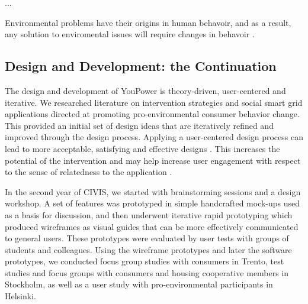 ... 

Environmental problems have their origins in human behavoir, and as a result, any solution to enviromental issues will require changes in behavoir 
\citep{Schultz2014}.

%
%
%

\subsection{Design and Development: the Continuation}

The design and development of YouPower is theory-driven, user-centered and iterative. We researched literature on intervention strategies and social smart grid applications directed at promoting pro-environmental consumer behavior change. This provided an initial set of design ideas that are iteratively refined and improved through the design process. Applying a user-centered design process can lead to more acceptable, satisfying and effective designs \citep{Brynjarsdottir2012}. This increases the potential of the intervention \citep{dick2012empowering} and may help increase user engagement with respect to the sense of relatedness to the application \citep{pierce2003state,schwartz2014people,edward2015review}. 

In the second year of CIVIS, we started with brainstorming sessions and a design workshop. A set of features was prototyped in simple handcrafted mock-ups used as a basis for discussion, and then underwent iterative rapid prototyping which produced wireframes as visual guides that can be more effectively communicated to general users. These prototypes were evaluated by user tests with groups of students and colleagues. Using the wireframe prototypes and later the software prototypes, we conducted focus group studies with consumers in Trento, test studies and focus groups with consumers and housing cooperative members in Stockholm, as well as a user study with pro-environmental participants in Helsinki. 


